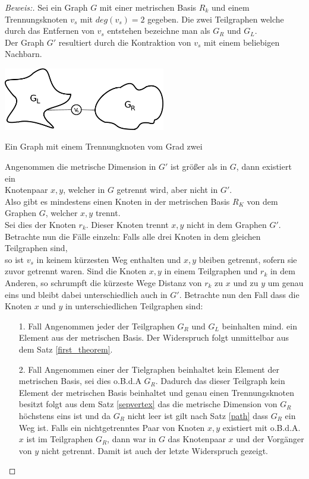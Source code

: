 \begin{proof}[Beweis:]
Sei ein Graph $G$ mit einer metrischen Basis $R_k$ und einem Trennungsknoten $v_s$ mit $deg(v_s)=2$ gegeben. Die zwei Teilgraphen welche durch das Entfernen von $v_s$ entstehen bezeichne man als $G_R$ und $G_L$.\\Der Graph $G'$ resultiert durch die Kontraktion von $v_s$ mit einem beliebigen Nachbarn.
\begin{floatingfigure}[l]{200pt}
\centering
\includegraphics*[width = 200pt]{bilder/proof4,2.pdf}
\caption{Ein Graph mit einem Trennungknoten vom Grad zwei}
\end{floatingfigure}
\vspace{-2mm}
Angenommen die metrische Dimension in $G'$ ist größer als in $G$, dann existiert ein\\Knotenpaar $x,y$, welcher in $G$ getrennt wird, aber nicht in $G'$.\\Also gibt es mindestens einen Knoten in der metrischen Basis $R_K$ von dem Graphen $G$, welcher $x,y$ trennt.\\Sei dies der Knoten $r_k$. Dieser Knoten trennt  $x,y$ nicht in dem Graphen $G'$.\\
Betrachte nun die Fälle einzeln: Falls alle drei Knoten in dem gleichen Teilgraphen sind,\\so ist $v_s$ in keinem kürzesten Weg enthalten und $x,y$ bleiben getrennt, sofern sie zuvor getrennt waren. Sind die Knoten $x,y$ in einem Teilgraphen und $r_k$ in dem Anderen, so schrumpft die kürzeste Wege Distanz von $r_k$ zu $x$ und zu $y$ um genau eins und bleibt dabei unterschiedlich auch in $G'$. Betrachte nun den Fall dass die Knoten $x$ und $y$ in unterschiedlichen Teilgraphen sind:
\begin{enumerate}
\item[1. Fall] Angenommen jeder der Teilgraphen $G_R$ und $G_L$ beinhalten mind. ein Element aus der metrischen Basis. Der Widerspruch folgt unmittelbar aus dem Satz \ref{first_theorem}.
\item[2. Fall] Angenommen einer der Tielgraphen beinhaltet kein Element der metrischen Basis, sei dies o.B.d.A $G_R$.
Dadurch das dieser Teilgraph kein Element der metrischen Basis beinhaltet und genau einen Trennungsknoten besitzt folgt aus dem Satz \ref{sepvertex} das die metrische Dimension von $G_R$ höchstens eins ist und da $G_R$ nicht leer ist gilt nach Satz \ref{path} dass $G_R$ ein Weg ist. Falls ein nichtgetrenntes Paar von Knoten $x,y$ existiert mit o.B.d.A. $x$ ist im Teilgraphen $G_R$, dann war in $G$ das Knotenpaar $x$ und der Vorgänger von $y$ nicht getrennt. Damit ist auch der letzte Widerspruch gezeigt.
\end{enumerate}
\end{proof}

